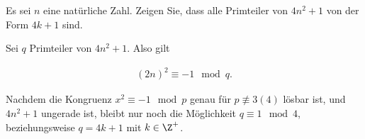 
\begin{exercise}

Es sei $n$ eine natürliche Zahl. Zeigen Sie, dass alle Primteiler von $4n^2 + 1$
von der Form $4k + 1$ sind.

\end{exercise}


\begin{solution}

Sei $q$ Primteiler von $4n^2 +1$. Also gilt

\begin{align*}
    (2n)^2 \equiv - 1 \mod{q}.
\end{align*}

Nachdem die Kongruenz $x^2 \equiv -1 \mod{p}$ genau für $p \nequiv 3 (4)$ lösbar ist,
und $4n^2 + 1$ ungerade ist, bleibt nur noch die Möglichkeit $q \equiv 1 \mod{4}$,
beziehungsweise $q = 4k+1$ mit $k \in \Z^+$. 

\end{solution}

